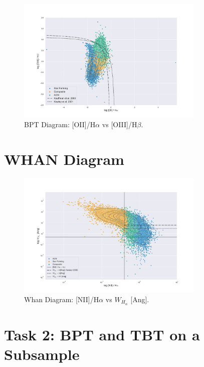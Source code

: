 \documentclass[letterpaper, oneside]{article}
\begin{document}
\begin{figure}[H]
	\centering
	\includegraphics[width=0.8\textwidth]{../BPT_Diagrams/BPT_oiHa_oiiiHb.pdf}
	\caption{BPT Diagram: [OII]/H$\alpha$ vs [OIII]/H$\beta$.}
	\label{fig:BPT_oiHa_oiiiHb}
\end{figure}

\section{WHAN Diagram}

\begin{figure}[H]
	\centering
	\includegraphics[width=0.8\textwidth]{../WHAN_diagram.pdf}
	\caption{Whan Diagram: [NII]/H$\alpha$ vs $W_{H_{\alpha}}$ [Ang].}
	\label{fig:WHAN}
\end{figure}


\section*{Task 2: BPT and TBT on a Subsample}
\end{document}
